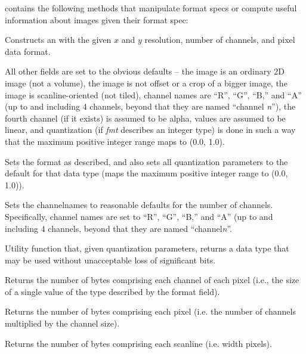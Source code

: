 \noindent \ImageSpec contains the following methods that
manipulate format specs or compute useful information about images given
their format spec:

Constructs an \ImageSpec with the given $x$ and $y$ resolution, number
of channels, and pixel data format.

All other fields are set to the obvious defaults -- the image is an
ordinary 2D image (not a volume), the image is not offset or a crop of a
bigger image, the image is scanline-oriented (not tiled), channel names
are ``R'', ``G'', ``B,'' and ``A'' (up to and including 4 channels,
beyond that they are named ``channel \emph{n}''), the fourth channel (if
it exists) is assumed to be alpha, values are assumed to be linear, and
quantization (if \emph{fmt} describes an integer type) is done in
such a way that the maximum positive integer range maps to (0.0, 1.0).
\apiend

Sets the format as described, and also sets all quantization parameters
to the default for that data type (maps the maximum positive integer
range to (0.0, 1.0)).
\apiend

Sets the {\kw channelnames} to reasonable defaults for the number of
channels.  Specifically, channel names are set to ``R'', ``G'', ``B,''
and ``A'' (up to and including 4 channels, beyond that they are named
``channel\emph{n}''.
\apiend

Utility function that, given quantization parameters, returns a data
type that may be used without unacceptable loss of significant bits.
\apiend

Returns the number of bytes comprising each channel of each pixel (i.e.,
the size of a single value of the type described by the {\kw format} field).
\apiend

Returns the number of bytes comprising each pixel (i.e. the number of
channels multiplied by the channel size).
\apiend

Returns the number of bytes comprising each scanline (i.e. {\kw width} pixels).
\apiend


